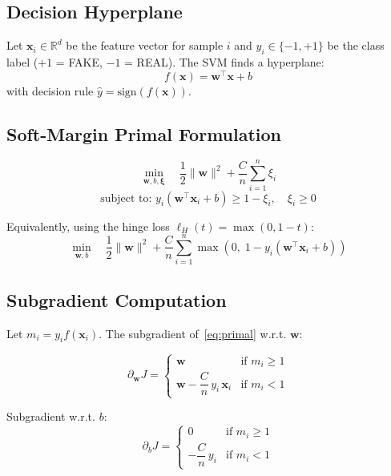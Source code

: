 \documentclass[conference]{IEEEtran}
\begin{document}
\subsection{Decision Hyperplane}

Let $\mathbf{x}_i \in \mathbb{R}^d$ be the feature vector for sample $i$ and
$y_i \in \{-1, +1\}$ be the class label ($+1$ = FAKE, $-1$ = REAL). The SVM
finds a hyperplane:
\begin{equation}
  f(\mathbf{x}) = \mathbf{w}^\top \mathbf{x} + b
\end{equation}
with decision rule $\hat{y} = \text{sign}(f(\mathbf{x}))$.

\subsection{Soft-Margin Primal Formulation}

\begin{equation}
  \min_{\mathbf{w}, b, \boldsymbol{\xi}} \quad
  \frac{1}{2}\|\mathbf{w}\|^2 + \frac{C}{n}\sum_{i=1}^n \xi_i
\end{equation}
\begin{equation}
  \text{subject to: } y_i(\mathbf{w}^\top \mathbf{x}_i + b) \geq 1 - \xi_i,
  \quad \xi_i \geq 0
\end{equation}

Equivalently, using the hinge loss $\ell_H(t) = \max(0, 1-t)$:
\begin{equation}
  \min_{\mathbf{w}, b} \quad
  \frac{1}{2}\|\mathbf{w}\|^2 + \frac{C}{n}\sum_{i=1}^n
  \max\!\left(0,\; 1 - y_i(\mathbf{w}^\top \mathbf{x}_i + b)\right)
  \label{eq:primal}
\end{equation}

\subsection{Subgradient Computation}

Let $m_i = y_i f(\mathbf{x}_i)$. The subgradient of~\eqref{eq:primal} w.r.t. $\mathbf{w}$:

\begin{equation}
  \partial_\mathbf{w} J =
  \begin{cases}
    \mathbf{w} & \text{if } m_i \geq 1 \\
    \mathbf{w} - \dfrac{C}{n}\,y_i\,\mathbf{x}_i & \text{if } m_i < 1
  \end{cases}
\end{equation}

Subgradient w.r.t. $b$:
\begin{equation}
  \partial_b J =
  \begin{cases}
    0 & \text{if } m_i \geq 1 \\
    -\dfrac{C}{n}\,y_i & \text{if } m_i < 1
  \end{cases}
\end{equation}
\end{document}
